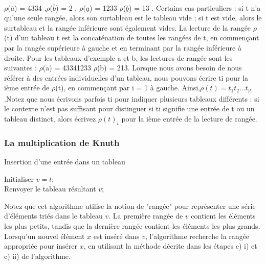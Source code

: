 \\
$\rho$($\overline{a}$) = 4334 ,$\rho$($\overline{b}$) = 2 , $\rho$($\underline{a}$) = 1233 $\rho$($\underline{b}$) = 13 . 
Certains cas particuliers : si t n'a qu'une seule rangée, alors son surtableau est le tableau vide ; si t est vide, alors le surtableau et la rangée inférieure sont également vides. La lecture de la rangée $\rho$(t) d'un tableau t est la concaténation de toutes les rangées de t, en commençant par la rangée supérieure à gauche et en terminant par la rangée inférieure à droite. Pour les tableaux d'exemple a et b, les lectures de rangée sont les suivantes : $\rho$(a) = 43341233 $\rho$(b) = 213. Lorsque nous avons besoin de nous référer à des entrées individuelles d'un tableau, nous pouvons écrire ti pour la ième entrée de $\rho$(t), en commençant par i = 1 à gauche. 
Ainsi,$\rho(t) = t_1 t_2 \ldots t_{|t|}$ .Notez que nous écrivons parfois ti pour indiquer plusieurs tableaux différents : si le contexte n'est pas suffisant pour distinguer si ti signifie une entrée de t ou un tableau distinct, alors écrivez $\rho(t)_i$ pour la ième entrée de la lecture de rangée.
\subsubsection{La multiplication de Knuth}
\begin{algorithm}
	\caption{Insertion d'une entrée dans un tableau}
	\BlankLine
	Initialiser $v=t$; \\
	Renvoyer le tableau résultant $v$;
	\end{algorithm}

Notez que cet algorithme utilise la notion de "rangée" pour représenter une série d'éléments triés dans le tableau $v$. La première rangée de $v$ contient les éléments les plus petits, tandis que la dernière rangée contient les éléments les plus grands. Lorsqu'un nouvel élément $x$ est inséré dans $v$, l'algorithme recherche la rangée appropriée pour insérer $x$, en utilisant la méthode décrite dans les étapes c) i) et c) ii) de l'algorithme.
